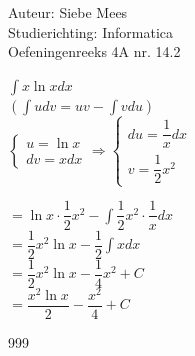 \documentclass[a4paper]{article}
\begin{document}
  
\noindent \large Auteur: Siebe Mees \\
\noindent \large Studierichting: Informatica\\
\noindent \large Oefeningenreeks 4A nr. 14.2\\

\medskip

\normalsize

$\displaystyle\int x \ln x dx $\\

$ \left( \displaystyle\int u dv = uv - \displaystyle\int vdu \right) $\\

$\left\{
   \begin{array}{l}
       u = \ln x\\
       dv = x dx
   \end{array}
\right.
\Rightarrow
\left\{
   \begin{array}{l}
       du = \dfrac{1}{x} dx \\
       v = \dfrac{1}{2}x^2
   \end{array}
\right.$

$ = \ln x \cdot \dfrac{1}{2}x^2 - \displaystyle\int \dfrac{1}{2}x^2 \cdot \dfrac{1}{x} dx $\\

$ = \dfrac{1}{2}x^2 \ln x - \dfrac{1}{2}\displaystyle\int x dx $\\

$ = \dfrac{1}{2}x^2 \ln x - \dfrac{1}{4}x^2 + C $\\

$ = \dfrac{x^2 \ln x}{2} - \dfrac{x^2}{4} + C $\\

\begin{thebibliography}{999}
\end{thebibliography}
\end{document}
